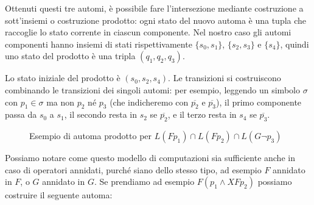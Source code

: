 Ottenuti questi tre automi, è possibile fare l'intersezione mediante costruzione a sott'insiemi o costruzione prodotto: ogni stato del nuovo automa è una tupla che raccoglie lo stato corrente in ciascun componente. Nel nostro caso gli automi componenti hanno insiemi di stati rispettivamente \(\{s_0,s_1\}\), \(\{s_2,s_3\}\) e \(\{s_4\}\), quindi uno stato del prodotto è una tripla \((q_1,q_2,q_3)\).

Lo stato iniziale del prodotto è \((s_0,s_2,s_4)\). Le transizioni si costruiscono combinando le transizioni dei singoli automi: per esempio, leggendo un simbolo \(\sigma\) con \(p_1\in\sigma\) ma non \(p_2\) né \(p_3\) (che indicheremo con \(\overline{p_2}\) e \(\overline{p_3}\)), il primo componente passa da \(s_0\) a \(s_1\), il secondo resta in \(s_2\) se \(\overline{p_2}\), e il terzo resta in \(s_4\) se \(\overline{p_3}\).

\begin{figure}[H]
  \centering
  \caption{Esempio di automa prodotto per \(L(Fp_1)\cap L(Fp_2)\cap L(G\neg p_3)\)}\label{fig:product_example}
\end{figure}

Possiamo notare come questo modello di computazioni sia sufficiente anche in caso di operatori annidati, purché siano dello stesso tipo, ad esempio \(F\) annidato in \(F\), o \(G\) annidato in \(G\). Se prendiamo ad esempio \(F(p_1 \land XF p_2)\) possiamo costruire il seguente automa:

